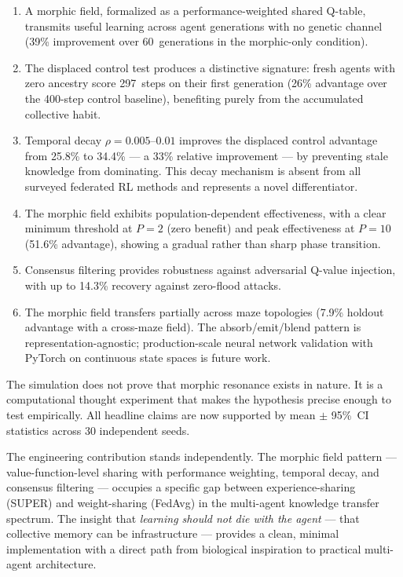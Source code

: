 \documentclass[twoside,11pt]{article}
\begin{document}
\begin{enumerate}[leftmargin=2em]
    \item A morphic field, formalized as a performance-weighted shared Q-table,
          transmits useful learning across agent generations with no genetic
          channel (39\% improvement over 60~generations in the morphic-only
          condition).
    \item The displaced control test produces a distinctive signature: fresh
          agents with zero ancestry score 297~steps on their first generation
          (26\% advantage over the 400-step control baseline), benefiting
          purely from the accumulated collective habit.
    \item Temporal decay $\rho = 0.005$--$0.01$ improves the displaced control
          advantage from 25.8\% to 34.4\% --- a 33\% relative improvement ---
          by preventing stale knowledge from dominating.  This decay mechanism
          is absent from all surveyed federated RL methods and represents a
          novel differentiator.
    \item The morphic field exhibits population-dependent effectiveness, with
          a clear minimum threshold at $P = 2$ (zero benefit) and peak
          effectiveness at $P = 10$ (51.6\% advantage), showing a gradual
          rather than sharp phase transition.
    \item Consensus filtering provides robustness against adversarial
          Q-value injection, with up to 14.3\% recovery against zero-flood
          attacks.
    \item The morphic field transfers partially across maze topologies
          (7.9\% holdout advantage with a cross-maze field).  The
          absorb/emit/blend pattern is representation-agnostic; production-scale
          neural network validation with PyTorch on continuous state spaces
          is future work.
\end{enumerate}

The simulation does not prove that morphic resonance exists in nature.  It is
a computational thought experiment that makes the hypothesis precise enough to
test empirically.  All headline claims are now supported by mean $\pm$ 95\%~CI
statistics across 30 independent seeds.

The engineering contribution stands independently.  The morphic field pattern
--- value-function-level sharing with performance weighting, temporal decay,
and consensus filtering --- occupies a specific gap between
experience-sharing (SUPER) and weight-sharing (FedAvg) in the multi-agent
knowledge transfer spectrum.  The insight that \emph{learning should not die
with the agent} --- that collective memory can be infrastructure --- provides a
clean, minimal implementation with a direct path from biological inspiration
to practical multi-agent architecture.
\end{document}
